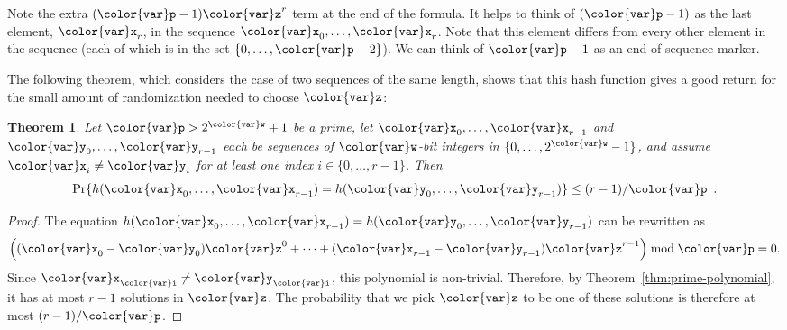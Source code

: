 \documentclass[10pt]{book}
\newcommand{\eqlabel}[1]{\label{eq:#1}}
\theoremstyle{plain}
\newtheorem{thm}{Theorem}[chapter]
\newcommand{\thmlabel}[1]{\label{thm:#1}}
\newcommand{\thmref}[1]{Theorem~\ref{thm:#1}}
\theoremstyle{definition}
\begin{document}
Note the extra $(\ensuremath{\mathtt{{\color{var}p}}}-1)\ensuremath{\mathtt{{\color{var}z}}}^r$ term at the end of the formula.  It helps
to think of $(\ensuremath{\mathtt{{\color{var}p}}}-1)$ as the last element, $\ensuremath{\mathtt{{\color{var}x}}}_r$, in the sequence
$\ensuremath{\mathtt{{\color{var}x}}}_0,\ldots,\ensuremath{\mathtt{{\color{var}x}}}_{r}$.  Note that this element differs from every other
element in the sequence (each of which is in the set $\{0,\ldots,\ensuremath{\mathtt{{\color{var}p}}}-2\}$).
We can think of $\ensuremath{\mathtt{{\color{var}p}}}-1$ as an end-of-sequence marker.

The following theorem, which considers the case of two sequences of
the same length, shows that this hash function gives a good return for
the small amount of randomization needed to choose \ensuremath{\mathtt{{\color{var}z}}}:

\begin{thm}\thmlabel{stringhash-eqlen}
  Let $\ensuremath{\mathtt{{\color{var}p}}}>2^{\ensuremath{\mathtt{{\color{var}w}}}}+1$ be a prime, let $\ensuremath{\mathtt{{\color{var}x}}}_0,\ldots,\ensuremath{\mathtt{{\color{var}x}}}_{r-1}$ and
  $\ensuremath{\mathtt{{\color{var}y}}}_0,\ldots,\ensuremath{\mathtt{{\color{var}y}}}_{r-1}$ each be sequences of \ensuremath{\mathtt{{\color{var}w}}}-bit integers in
  $\{0,\ldots,2^{\ensuremath{\mathtt{{\color{var}w}}}}-1\}$, and assume $\ensuremath{\mathtt{{\color{var}x}}}_i \neq \ensuremath{\mathtt{{\color{var}y}}}_i$ for at least
  one index $i\in\{0,\ldots,r-1\}$. Then
  \[
     \Pr\{ h(\ensuremath{\mathtt{{\color{var}x}}}_0,\ldots,\ensuremath{\mathtt{{\color{var}x}}}_{r-1}) =  h(\ensuremath{\mathtt{{\color{var}y}}}_0,\ldots,\ensuremath{\mathtt{{\color{var}y}}}_{r-1}) \} 
          \le (r-1)/\ensuremath{\mathtt{{\color{var}p}}} \enspace .
  \] 
\end{thm}

\begin{proof}
  The equation $h(\ensuremath{\mathtt{{\color{var}x}}}_0,\ldots,\ensuremath{\mathtt{{\color{var}x}}}_{r-1}) =  h(\ensuremath{\mathtt{{\color{var}y}}}_0,\ldots,\ensuremath{\mathtt{{\color{var}y}}}_{r-1})$
  can be rewritten as
  \begin{equation}  \eqlabel{strhash-eqlen}
    \left(
       (\ensuremath{\mathtt{{\color{var}x}}}_0-\ensuremath{\mathtt{{\color{var}y}}}_0)\ensuremath{\mathtt{{\color{var}z}}}^0+\cdots+(\ensuremath{\mathtt{{\color{var}x}}}_{r-1}-\ensuremath{\mathtt{{\color{var}y}}}_{r-1})\ensuremath{\mathtt{{\color{var}z}}}^{r-1} 
    \right)\bmod \ensuremath{\mathtt{{\color{var}p}}} = 0.
  \end{equation}
  Since $\ensuremath{\mathtt{{\color{var}x}}}_\ensuremath{\mathtt{{\color{var}i}}}\neq \ensuremath{\mathtt{{\color{var}y}}}_\ensuremath{\mathtt{{\color{var}i}}}$, this polynomial is non-trivial.  Therefore,
  by \thmref{prime-polynomial}, it has at most $r-1$ solutions in \ensuremath{\mathtt{{\color{var}z}}}.
  The probability that we pick \ensuremath{\mathtt{{\color{var}z}}} to be one of these solutions is therefore
  at most $(r-1)/\ensuremath{\mathtt{{\color{var}p}}}$.
\end{proof}
\end{document}
